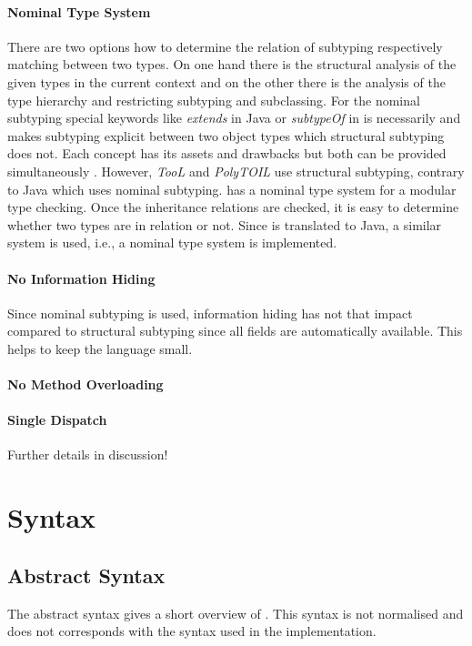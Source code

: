 \paragraph{Nominal Type System}
There are two options how to determine the relation of subtyping
respectively matching between two types. On one hand there is the
structural analysis of the given types in the current context and on
the other there is the analysis of the type hierarchy and restricting
subtyping and subclassing. For the nominal subtyping special keywords
like \emph{extends} in Java or \emph{subtypeOf} in \ooplss is necessarily
and makes subtyping explicit between two object types which structural
subtyping does not.  Each concept has its assets and drawbacks but both
can be provided simultaneously \cite{malayeri_integrating_2008}. However,
\emph{TooL} and \emph{PolyTOIL} use structural subtyping, contrary to
Java which uses nominal subtyping. \ooplss has a nominal type system
for a modular type checking. Once the inheritance relations are checked,
it is easy to determine whether two types are in relation or not. Since
\ooplss is translated to Java, a similar system is used, i.e., a nominal
type system is implemented.

\paragraph{No Information Hiding}
Since nominal subtyping is used, information hiding has not that impact
compared to structural subtyping since all fields are automatically
available. This helps to keep the language small.

\paragraph{No Method Overloading}

\paragraph{Single Dispatch}

Further details in discussion!

\section{Syntax}
\subsection{Abstract Syntax}
The abstract syntax gives a short overview of \ooplss. This syntax is
not normalised and does not corresponds with the syntax used in the
implementation.

